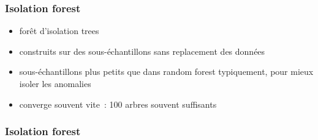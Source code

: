 \documentclass{formation}
\begin{document}
\begin{frame}
  \frametitle{Isolation forest}
  \begin{itemize}
  \item forêt d'isolation trees
  \item construits sur des sous-échantillons sans replacement des
    données
  \item sous-échantillons plus petits que dans random forest
    typiquement, pour mieux isoler les anomalies
  \item converge souvent vite : 100 arbres souvent suffisants
  \end{itemize}
\end{frame}

\begin{frame}
  \frametitle{Isolation forest}
\end{frame}
\end{document}
